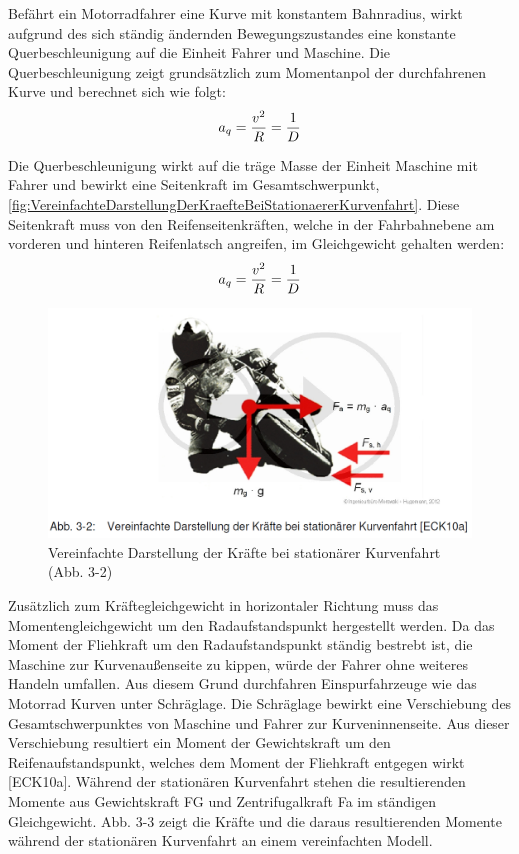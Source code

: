 Befährt ein Motorradfahrer eine Kurve mit konstantem Bahnradius, wirkt aufgrund des sich ständig ändernden Bewegungszustandes eine konstante Querbeschleunigung auf die Einheit Fahrer und Maschine. Die Querbeschleunigung zeigt grundsätzlich zum Momentanpol der durchfahrenen Kurve und berechnet sich wie folgt:
\begin{align}
	\centering
	a_q = \frac{v^2}{R} = \frac{1}{D}
	\label{gl:Querbeschleunigung}
\end{align}

Die Querbeschleunigung wirkt auf die träge Masse der Einheit Maschine mit Fahrer und bewirkt eine Seitenkraft im Gesamtschwerpunkt, \autoref{fig:VereinfachteDarstellungDerKraefteBeiStationaererKurvenfahrt}. Diese Seitenkraft muss von den Reifenseitenkräften, welche in der Fahrbahnebene am vorderen und hinteren Reifenlatsch angreifen, im Gleichgewicht gehalten werden:
\begin{align}
	\centering
	a_q = \frac{v^2}{R} = \frac{1}{D}
	\label{gl:Querbeschleunigung}
\end{align}

\begin{figure}[H]
	\centering
	\includegraphics[width=\linewidth]{Bilder/VereinfachteDarstellungDerKraefteBeiStationaererKurvenfahrt.png}
	\caption{Vereinfachte Darstellung der Kräfte bei stationärer Kurvenfahrt (Abb. 3-2)}
	\label{fig:VereinfachteDarstellungDerKraefteBeiStationaererKurvenfahrt}
\end{figure}
Zusätzlich zum Kräftegleichgewicht in horizontaler Richtung muss das Momentengleichgewicht um den Radaufstandspunkt hergestellt werden. Da das Moment der Fliehkraft um den Radaufstandspunkt ständig bestrebt ist, die Maschine zur Kurvenaußenseite zu kippen, würde der Fahrer ohne weiteres Handeln umfallen. Aus diesem Grund durchfahren Einspurfahrzeuge wie das Motorrad Kurven unter Schräglage. Die Schräglage bewirkt eine Verschiebung des Gesamtschwerpunktes von Maschine und Fahrer zur Kurveninnenseite. Aus dieser Verschiebung resultiert ein Moment der Gewichtskraft um den Reifenaufstandspunkt, welches dem Moment der Fliehkraft entgegen wirkt [ECK10a]. Während der stationären Kurvenfahrt stehen die resultierenden Momente aus Gewichtskraft FG und Zentrifugalkraft Fa im ständigen Gleichgewicht. Abb. 3-3 zeigt die Kräfte und die daraus resultierenden Momente während der stationären Kurvenfahrt an einem vereinfachten Modell.

